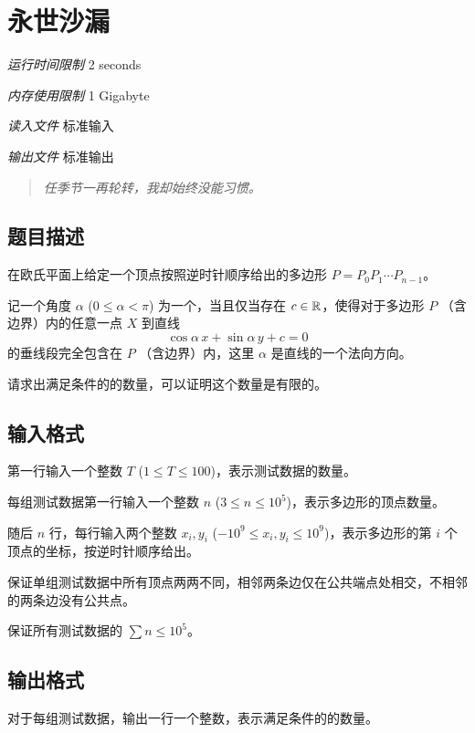 \section[K. 永世沙漏]{ 永世沙漏}

\textit{运行时间限制}   2 seconds

\textit{内存使用限制} 1 Gigabyte

\textit{读入文件} \qquad 标准输入

\textit{输出文件} \qquad 标准输出


\begin{quote}
	\textit{任季节一再轮转，我却始终没能习惯。}
\end{quote}

\subsection{题目描述}

在欧氏平面上给定一个顶点按照逆时针顺序给出的多边形 $P = P_0P_1 \cdots P_{n-1}$。

记一个角度 $\alpha$ ($0 \le \alpha < \pi$) 为一个，当且仅当存在 $c \in \mathbb{R}$，使得对于多边形 $P$ （含边界）内的任意一点 $X$ 到直线 
\[
	\cos \alpha\,x + \sin \alpha\,y + c = 0
\]
的垂线段完全包含在 $P$ （含边界）内，这里 $\alpha$ 是直线的一个法向方向。


请求出满足条件的的数量，可以证明这个数量是有限的。

\subsection{输入格式}

第一行输入一个整数 $T$ ($1 \le T \le 100$)，表示测试数据的数量。

每组测试数据第一行输入一个整数 $n$ ($3 \le n \le 10^5$)，表示多边形的顶点数量。

随后 $n$ 行，每行输入两个整数 $x_i, y_i$ ($-10^9 \le x_i, y_i \le 10^9$)，表示多边形的第 $i$ 个顶点的坐标，按逆时针顺序给出。

保证单组测试数据中所有顶点两两不同，相邻两条边仅在公共端点处相交，不相邻的两条边没有公共点。

保证所有测试数据的 $\sum n \le 10^5$。

\subsection{输出格式}

对于每组测试数据，输出一行一个整数，表示满足条件的的数量。

